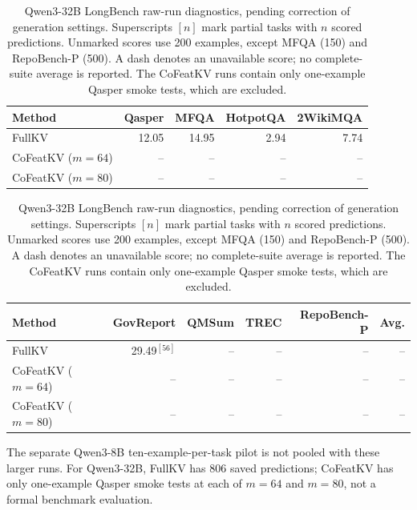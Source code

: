 \documentclass{article} %
\begin{document}
\begin{table}[H]
\centering
\caption{Qwen3-32B LongBench raw-run diagnostics, pending correction
of generation settings. Superscripts $[n]$ mark partial tasks with $n$
scored predictions. Unmarked scores use 200 examples, except MFQA (150)
and RepoBench-P (500). A dash denotes an unavailable score; no complete-suite
average is reported. The CoFeatKV runs contain only one-example Qasper smoke tests, which are excluded.}
\label{tab:longbench-qwen32b-audit}
\small
\setlength{\tabcolsep}{3pt}
\begin{tabular}{lrrrr}
\toprule
Method & Qasper & MFQA & HotpotQA & 2WikiMQA \\
\midrule
FullKV & 12.05 & 14.95 & 2.94 & 7.74 \\
CoFeatKV ($m=64$) & -- & -- & -- & -- \\
CoFeatKV ($m=80$) & -- & -- & -- & -- \\
\bottomrule
\end{tabular}
\par\medskip
\begin{tabular}{lrrrrr}
\toprule
Method & GovReport & QMSum & TREC & RepoBench-P & Avg. \\
\midrule
FullKV & 29.49$^{[56]}$ & -- & -- & -- & -- \\
CoFeatKV ($m=64$) & -- & -- & -- & -- & -- \\
CoFeatKV ($m=80$) & -- & -- & -- & -- & -- \\
\bottomrule
\end{tabular}
\end{table}

The separate Qwen3-8B ten-example-per-task pilot is not pooled with these
larger runs. For Qwen3-32B, FullKV has 806 saved predictions; CoFeatKV has only
one-example Qasper smoke tests at each of $m=64$ and $m=80$, not a formal
benchmark evaluation.
\fi
\end{document}
